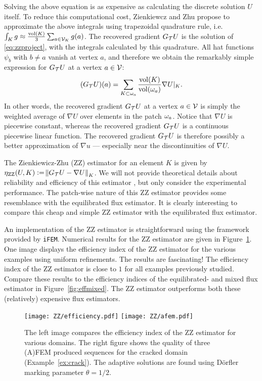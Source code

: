 \documentclass[thesis.tex]{subfiles}
\begin{document}
Solving the above equation is as expensive as calculating the discrete solution $U$ itself. To
reduce this computational cost, Zienkiewcz and Zhu \cite{zienkiewicz1987simple} propose to approximate the
above integrals using trapezoidal quadrature rule, i.e.~$\int_K g \approx \frac{\operatorname{vol}(K)}{3} \sum_{a \in \mathcal{V}_K} g(a)$. 
The recovered gradient $G_{\mathcal{T}} U$ is the solution of \eqref{eq:zzproject}, with the integrals calculated by this quadrature.
All hat functions $\psi_b$ with $b\ne a$ vanish at vertex $a$, and therefore we obtain the remarkably simple expression
for $G_{\mathcal{T}} U$ at a vertex $a \in \mathcal{V}$:
\[
  (G_{\mathcal{T}} U)(a) = \sum_{K \subset \omega_a} \frac{\operatorname{vol}(K)}{\operatorname{vol}(\omega_a)} \nabla U|_K.
\]
In other words, the recovered gradient $G_{\mathcal{T}} U$ at a vertex $a \in \mathcal{V}$ is simply the weighted average of $\nabla U$ over
elements in the patch $\omega_a$. Notice that $\nabla U$ is piecewise constant, whereas
the recovered gradient $G_{\mathcal{T}} U$ is a continuous piecewise linear function. The recovered gradient $G_{\mathcal{T}} U$ is 
therefore possibly a better approximation of $\nabla u$ --- especially near the discontinuities of $\nabla U$.

The Zienkiewicz-Zhu (ZZ) estimator for an element $K$ is given by ${\eta_\text{ZZ}(U, K) := \norm{G_{\mathcal{T}} U - \nabla U}_K}$. We will
not provide theoretical details about reliability and efficiency of this estimator
\cite{rodriguez1994some,zienkiewicz1992superconvergent}, but only consider
the experimental performance. The patch-wise nature of this ZZ estimator provides
some resemblance with the equilibrated flux estimator.
It is clearly interesting to compare this cheap and simple ZZ estimator with the equilibrated flux estimator.

An implementation of the ZZ estimator is straightforward using the framework provided by \texttt{iFEM}. 
Numerical results for the ZZ estimator are given in Figure~\ref{fig:ZZ}.
One image displays the efficiency index of the ZZ estimator for the various examples using uniform refinements.
The results are fascinating! The efficiency index of the ZZ estimator is close to $1$ for all examples previously
studied. Compare these results to the efficiency indices of the equilibrated- and mixed flux estimator in Figure~\ref{fig:effmixed}.
The ZZ estimator outperforms both these (relatively) expensive flux estimators. 
\begin{figure}
  \centering
  \texttt{[image: ZZ/efficiency.pdf]}
  \texttt{[image: ZZ/afem.pdf]}
  \caption{
    The left image compares the efficiency index of the ZZ estimator for various domains.
    The right figure shows the quality of three (A)FEM produced sequences for the cracked domain (Example~\ref{ex:crack}). The adaptive solutions are found using D\"orfler marking parameter $\theta = 1/2$.
  }
  \label{fig:ZZ}
\end{figure}
\end{document}
